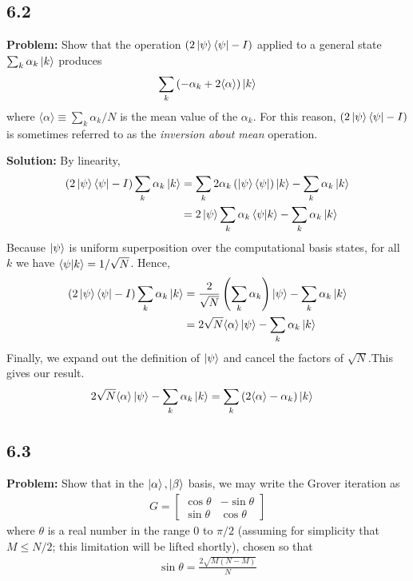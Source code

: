 \documentclass{article}
\begin{document}
\subsection*{6.2}
\textbf{Problem:} Show that the operation $(2\ket{\psi}\bra{\psi}-I)$ applied to a general state $\sum_k \alpha_k \ket{k}$ produces
\begin{align}
    \sum_k \left(-\alpha_k+2\langle\alpha\rangle\right)\ket{k}
\end{align}
where $\langle\alpha\rangle \equiv \sum_k\alpha_k/N$ is the mean value of the $\alpha_k$. For this reason, $(2\ket{\psi}\bra{\psi}-I)$ is sometimes referred to as the \emph{inversion about mean} operation.

\textbf{Solution:} By linearity,
\begin{align*}
    (2\ket{\psi}\bra{\psi}-I)\sum_k \alpha_k\ket{k} &= \sum_k 2 \alpha_k\left(\ket{\psi}\bra{\psi}\right)\ket{k} - \sum_k \alpha_k\ket{k} \\
    &= 2\ket{\psi}\sum_k\alpha_k\braket{\psi}{k}-\sum_k\alpha_k\ket{k}
\end{align*}
Because $\ket{\psi}$ is uniform superposition over the computational basis states, for all $k$ we have $\braket{\psi}{k}=1/\sqrt{N}$. Hence,
\begin{align}
(2\ket{\psi}\bra{\psi}-I)\sum_k \alpha_k\ket{k} &= \frac{2}{\sqrt{N}}\left(\sum_k\alpha_k\right)\ket{\psi} - \sum_k \alpha_k\ket{k} \\
&= 2\sqrt{N} \langle\alpha\rangle\ket{\psi} - \sum_k\alpha_k\ket{k}
\end{align}
Finally, we expand out the definition of $\ket{\psi}$ and cancel the factors of $\sqrt{N}$.This gives our result. 
\begin{align}
    2\sqrt{N} \langle\alpha\rangle\ket{\psi} - \sum_k\alpha_k\ket{k} &= \sum_k\left(2\langle\alpha\rangle-\alpha_k\right)\ket{k}
\end{align}

\subsection*{6.3}
\textbf{Problem:} Show that in the $\ket{\alpha}, \ket{\beta}$ basis, we may write the Grover iteration as
\begin{align}
    G = 
    \begin{bmatrix} \label{eq:matrix_G}
        \cos\theta & -\sin\theta \\
        \sin\theta & \cos\theta
    \end{bmatrix}
\end{align}
where $\theta$ is a real number in the range 0 to $\pi/2$ (assuming for simplicity that $M\leq N/2$; this limitation will be lifted shortly), chosen so that
\begin{align} \label{eq:theta_value}
    \sin\theta =\frac{2\sqrt{M(N-M)}}{N}
\end{align}
\end{document}
